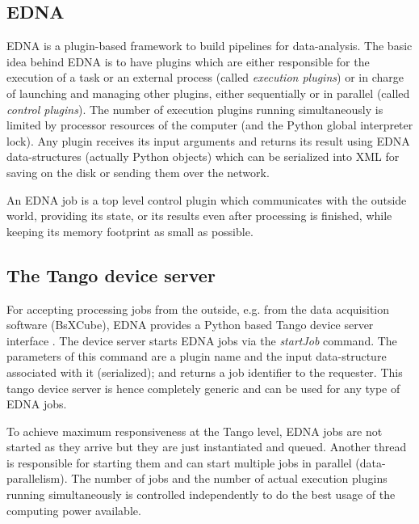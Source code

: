 \documentclass[preprint,pdf]{iucr}              %
\begin{document}


\subsection{EDNA}
EDNA is a plugin-based framework to build pipelines for data-analysis.
The basic idea behind EDNA is to have plugins which are either responsible for the execution
of a task or an external process (called \textit{execution plugins}) or in
charge of launching and managing other plugins, either sequentially or in
parallel (called \textit{control plugins}).
The number of execution plugins running simultaneously is limited by processor
resources of the computer (and the Python global interpreter lock).
Any plugin receives its input arguments and returns its result using
EDNA data-structures (actually Python objects) which can be serialized into XML
for saving on the disk or sending them over the network.

An EDNA job is a top level control plugin which communicates with the outside
world, providing its state, or its results even after processing is finished,
while keeping its memory footprint as small as possible.

\subsection{The Tango device server}
For accepting processing jobs from the outside, e.g. from the data
acquisition software (BsXCube), EDNA provides a Python based Tango device
server interface \cite{tango,pytango}.
The device server starts EDNA jobs via the \textit{startJob} command.
The parameters of this command are a plugin name and the input data-structure
associated with it (serialized); and returns a job identifier to the requester.
This tango device server is hence completely generic and can be used for any
type of EDNA jobs.

To achieve maximum responsiveness at the Tango level, EDNA jobs are not started as
they arrive but they are just instantiated and queued.
Another thread is responsible for starting them and can start multiple jobs in parallel
(data-parallelism). 
The number of jobs and the number of actual execution
plugins running simultaneously is controlled independently to do the best usage
of the computing power available.
\end{document}
